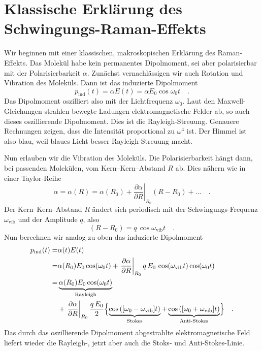 \section{Klassische Erklärung des Schwingungs-Raman-Effekts}

Wir beginnen mit einer klassischen, makroskopischen Erklärung des Raman-Effekts. Das Molekül habe kein permanentes Dipolmoment, sei aber polarisierbar mit der Polarisierbarkeit $\alpha$. Zunächst vernachlässigen wir auch Rotation und Vibration des Moleküls. Dann ist das induzierte Dipolmoment
\begin{equation}
p_\text{ind}(t) = \alpha E(t) = \alpha E_0 \cos \omega_0 t \quad .
\end{equation}
Das Dipolmoment oszilliert also mit der Lichtfrequenz $\omega_0$. Laut den Maxwell-Gleichungen strahlen bewegte Ladungen elektromagnetische Felder ab, so auch dieses oszillierende Dipolmoment. Dies ist die Rayleigh-Streuung. Genauere Rechnungen zeigen, dass die Intensität proportional zu $\omega^4$ ist. Der Himmel ist also blau, weil blaues Licht besser Rayleigh-Streuung macht.

Nun erlauben wir die Vibration des Moleküls. Die Polarisierbarkeit hängt dann, bei passenden Molekülen, vom Kern--Kern--Abstand $R$ ab. Dies nähern wie in einer Taylor-Reihe
\begin{equation}
\alpha = \alpha(R) = \alpha(R_0) + \left. \frac{\partial \alpha}{\partial R} \right|_{R_0}  \left( R - R_0 \right) + \dots \quad .
\end{equation}
Der Kern--Kern--Abstand $R$ ändert sich periodisch mit der Schwingungs-Frequenz $\omega_\text{vib}$ und der Amplitude $q$, also
\begin{equation}
\left( R - R_0 \right) = q \, \cos \omega_\text{vib} t \quad .
\end{equation}
Nun berechnen wir analog zu oben das induzierte Dipolmoment
\begin{align}
p_\text{ind}(t) = & \alpha(t) E(t) \\
= & \alpha(R_0) E_0 \cos(\omega_0 t) +
\left. \frac{\partial \alpha}{\partial R} \right|_{R_0}   q \,  E_0 \, \cos (\omega_\text{vib} t)  \cos(\omega_0 t) \\
= & \underbrace{  \alpha(R_0) E_0 \cos(\omega_0 t) }_\text{Rayleigh} \\
& + \left. \frac{\partial \alpha}{\partial R} \right|_{R_0}  \frac{ q \,  E_0 }{2} 
\Bigl\{ 
\underbrace{ \cos \left( [\omega_0 -\omega_\text{vib}] t \right)}_\text{Stokes}  +  \underbrace{\cos \left( [\omega_0 + \omega_\text{vib}] t \right)  
}_\text{Anti-Stokes} 
\Bigr\}  \quad .
\nonumber
\end{align}
Das durch das oszillierende Dipolmoment abgestrahlte elektromagnetische Feld liefert wieder die Rayleigh-, jetzt aber auch die Stoks- und Anti-Stokes-Linie.

